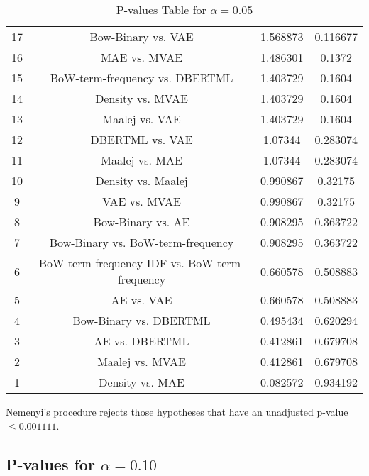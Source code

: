 \documentclass[a4paper,10pt]{article}
\begin{document}
\begin{landscape}
\begin{table}[!htp]
\begin{tabular}{cccc}
17&Bow-Binary vs. VAE&1.568873&0.116677\\
16&MAE vs. MVAE&1.486301&0.1372\\
15&BoW-term-frequency vs. DBERTML&1.403729&0.1604\\
14&Density vs. MVAE&1.403729&0.1604\\
13&Maalej vs. VAE&1.403729&0.1604\\
12&DBERTML vs. VAE&1.07344&0.283074\\
11&Maalej vs. MAE&1.07344&0.283074\\
10&Density vs. Maalej&0.990867&0.32175\\
9&VAE vs. MVAE&0.990867&0.32175\\
8&Bow-Binary vs. AE&0.908295&0.363722\\
7&Bow-Binary vs. BoW-term-frequency&0.908295&0.363722\\
6&BoW-term-frequency-IDF vs. BoW-term-frequency&0.660578&0.508883\\
5&AE vs. VAE&0.660578&0.508883\\
4&Bow-Binary vs. DBERTML&0.495434&0.620294\\
3&AE vs. DBERTML&0.412861&0.679708\\
2&Maalej vs. MVAE&0.412861&0.679708\\
1&Density vs. MAE&0.082572&0.934192\\
\hline
\end{tabular}
\caption{P-values Table for $\alpha=0.05$}
\end{table}Nemenyi's procedure rejects those hypotheses that have an unadjusted p-value $\le0.001111$.

\pagebreak

\subsection{P-values for $\alpha=0.10$}


\end{landscape}
\end{document}
